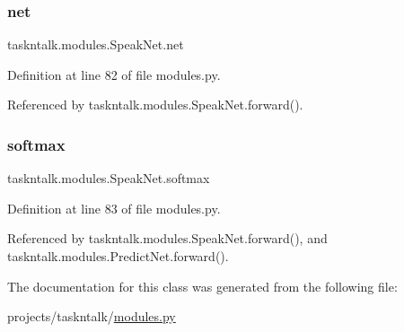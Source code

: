 \subsubsection{\texorpdfstring{net}{net}}
{\footnotesize\ttfamily taskntalk.\+modules.\+Speak\+Net.\+net}



Definition at line 82 of file modules.\+py.



Referenced by taskntalk.\+modules.\+Speak\+Net.\+forward().

\mbox{\label{classtaskntalk_1_1modules_1_1SpeakNet_aaad557b1a44eca11d0d8d3c5022edb0a}} 
\subsubsection{\texorpdfstring{softmax}{softmax}}
{\footnotesize\ttfamily taskntalk.\+modules.\+Speak\+Net.\+softmax}



Definition at line 83 of file modules.\+py.



Referenced by taskntalk.\+modules.\+Speak\+Net.\+forward(), and taskntalk.\+modules.\+Predict\+Net.\+forward().



The documentation for this class was generated from the following file\+:\begin{DoxyCompactItemize}
\item 
projects/taskntalk/\hyperlink{projects_2taskntalk_2modules_8py}{modules.\+py}\end{DoxyCompactItemize}
